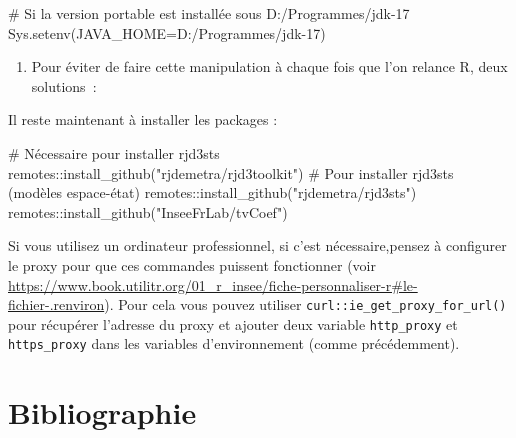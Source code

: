 \documentclass[
  a4paper,
  DIV=11,
  numbers=noendperiod,
  french]{scrartcl}
\newcommand{\VERB}{\Verb[commandchars=\\\{\}]}
\newenvironment{Shaded}{\begin{snugshade}}{\end{snugshade}}
\newcommand{\AttributeTok}[1]{\textcolor[rgb]{0.40,0.45,0.13}{#1}}
\newcommand{\CommentTok}[1]{\textcolor[rgb]{0.37,0.37,0.37}{#1}}
\newcommand{\FunctionTok}[1]{\textcolor[rgb]{0.28,0.35,0.67}{#1}}
\newcommand{\NormalTok}[1]{\textcolor[rgb]{0.00,0.23,0.31}{#1}}
\newcommand{\SpecialCharTok}[1]{\textcolor[rgb]{0.37,0.37,0.37}{#1}}
\newcommand{\StringTok}[1]{\textcolor[rgb]{0.13,0.47,0.30}{#1}}
\providecommand{\tightlist}{%
  \setlength{\itemsep}{0pt}\setlength{\parskip}{0pt}}\usepackage{longtable,booktabs,array}
\newcommand\1{{\mathds 1}}
\theoremstyle{remark}
\begin{document}
\begin{Shaded}
\begin{Highlighting}[]
\CommentTok{\# Si la version portable est installée sous D:/Programmes/jdk{-}17}
\FunctionTok{Sys.setenv}\NormalTok{(}\AttributeTok{JAVA\_HOME=}\StringTok{\textquotesingle{}D:/Programmes/jdk{-}17\textquotesingle{}}\NormalTok{)}
\end{Highlighting}
\end{Shaded}

\begin{enumerate}
\def\labelenumi{\arabic{enumi}.}
\setcounter{enumi}{1}
\tightlist
\item
  Pour éviter de faire cette manipulation à chaque fois que l'on relance
  R, deux solutions~:
\end{enumerate}


Il reste maintenant à installer les packages :

\begin{Shaded}
\begin{Highlighting}[]
\CommentTok{\# Nécessaire pour installer rjd3sts}
\NormalTok{remotes}\SpecialCharTok{::}\FunctionTok{install\_github}\NormalTok{(}\StringTok{"rjdemetra/rjd3toolkit"}\NormalTok{)}
\CommentTok{\# Pour installer rjd3sts (modèles espace{-}état)}
\NormalTok{remotes}\SpecialCharTok{::}\FunctionTok{install\_github}\NormalTok{(}\StringTok{"rjdemetra/rjd3sts"}\NormalTok{)}
\NormalTok{remotes}\SpecialCharTok{::}\FunctionTok{install\_github}\NormalTok{(}\StringTok{"InseeFrLab/tvCoef"}\NormalTok{)}
\end{Highlighting}
\end{Shaded}

Si vous utilisez un ordinateur professionnel, si c'est nécessaire,pensez
à configurer le proxy pour que ces commandes puissent fonctionner (voir
\url{https://www.book.utilitr.org/01_r_insee/fiche-personnaliser-r\#le-fichier-.renviron}).
Pour cela vous pouvez utiliser \texttt{curl::ie\_get\_proxy\_for\_url()}
pour récupérer l'adresse du proxy et ajouter deux variable
\texttt{http\_proxy} et \texttt{https\_proxy} dans les variables
d'environnement (comme précédemment).

\section*{Bibliographie}\label{bibliographie}

\printbibliography[heading=none]
\end{document}
